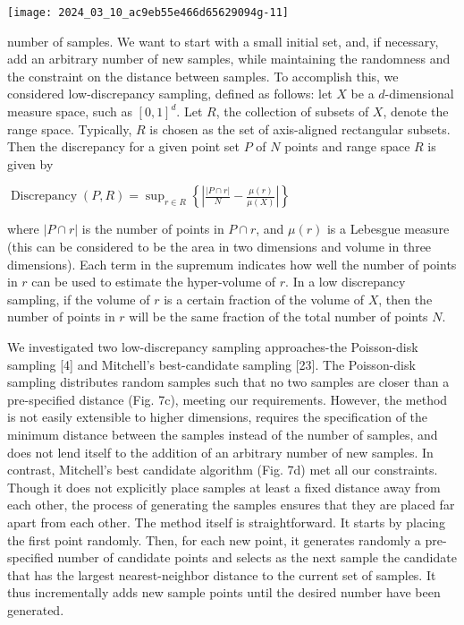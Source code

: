 \documentclass[10pt]{article}
\begin{document}
\begin{center}
\texttt{[image: 2024\_03\_10\_ac9eb55e466d65629094g-11]}
\end{center}

number of samples. We want to start with a small initial set, and, if necessary, add an arbitrary number of new samples, while maintaining the randomness and the constraint on the distance between samples. To accomplish this, we considered low-discrepancy sampling, defined as follows: let $X$ be a $d$-dimensional measure space, such as $[0,1]^{d}$. Let $R$, the collection of subsets of $X$, denote the range space. Typically, $R$ is chosen as the set of axis-aligned rectangular subsets. Then the discrepancy for a given point set $P$ of $N$ points and range space $R$ is given by

$\operatorname{Discrepancy}(P, R)=\sup _{r \in R}\left\{\left|\frac{|P \cap r|}{N}-\frac{\mu(r)}{\mu(X)}\right|\right\}$

where $|P \cap r|$ is the number of points in $P \cap r$, and $\mu(r)$ is a Lebesgue measure (this can be considered to be the area in two dimensions and volume in three dimensions). Each term in the supremum indicates how well the number of points in $r$ can be used to estimate the hyper-volume of $r$. In a low discrepancy sampling, if the volume of $r$ is a certain fraction of the volume of $X$, then the number of points in $r$ will be the same fraction of the total number of points $N$.

We investigated two low-discrepancy sampling approaches-the Poisson-disk sampling [4] and Mitchell's best-candidate sampling [23]. The Poisson-disk sampling distributes random samples such that no two samples are closer than a pre-specified distance (Fig. 7c), meeting our requirements. However, the method is not easily extensible to higher dimensions, requires the specification of the minimum distance between the samples instead of the number of samples, and does not lend itself to the addition of an arbitrary number of new samples. In contrast, Mitchell's best candidate algorithm (Fig. 7d) met all our constraints. Though it does not explicitly place samples at least a fixed distance away from each other, the process of generating the samples ensures that they are placed far apart from each other. The method itself is straightforward. It starts by placing the first point randomly. Then, for each new point, it generates randomly a pre-specified number of candidate points and selects as the next sample the candidate that has the largest nearest-neighbor distance to the current set of samples. It thus incrementally adds new sample points until the desired number have been generated.
\end{document}
